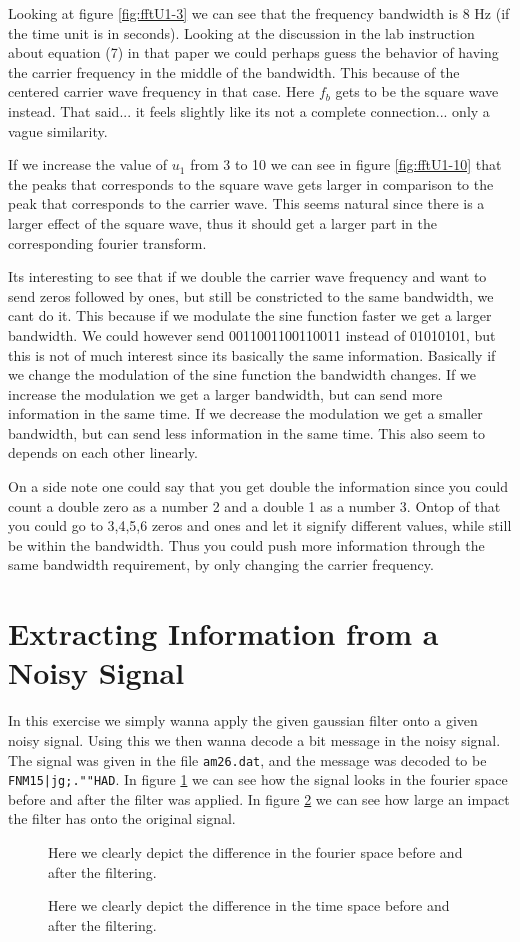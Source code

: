 \documentclass[11pt]{article}
\begin{document}
Looking at figure \ref{fig:fftU1-3} we can see that the frequency bandwidth is 8 Hz (if the time unit is in seconds). Looking at the discussion in the lab instruction about equation (7) in that paper we could perhaps guess the behavior of having  the carrier frequency in the middle of the bandwidth. This because of the centered carrier wave frequency in that case. Here $f_b$ gets to be the square wave instead. That said... it feels slightly like its not a complete connection... only a vague similarity. 

If we increase the value of $u_1$ from 3 to 10 we can see in figure \ref{fig:fftU1-10} that the peaks that corresponds to the square wave gets larger in comparison to the peak that corresponds to the carrier wave. This seems natural since there is a larger effect of the square wave, thus it should get a larger part in the corresponding fourier transform. 

Its interesting to see that if we double the carrier wave frequency and want to send zeros followed by ones, but still be constricted to the same bandwidth, we cant do it. This because if we modulate the sine function faster we get a larger bandwidth. We could however send 0011001100110011 instead of 01010101, but this is not of much interest since its basically the same information. Basically if we change the modulation of the sine function the bandwidth changes. If we increase the modulation we get a larger bandwidth, but can send more information in the same time. If we decrease the modulation we get a smaller bandwidth, but can send less information in the same time. This also seem to depends on each other linearly. 

On a side note one could say that you get double the information since you could count a double zero as a number 2 and a double 1 as a number 3. Ontop of that you could go to 3,4,5,6 zeros and ones and let it signify different values, while still be within the bandwidth. Thus you could push more information through the same bandwidth requirement, by only changing the carrier frequency. 

\newpage
\section{Extracting Information from a Noisy Signal}
In this exercise we simply wanna apply the given gaussian filter onto a given noisy signal. Using this we then wanna decode a bit message in the noisy signal. The signal was given in the file \verb+am26.dat+, and the message was decoded to be \verb+FNM15|jg;.""HAD+. In figure \ref{fig:freqPowSpec} we can see how the signal looks in the fourier space before and after the filter was applied. In figure \ref{fig:signal} we can see how large an impact the filter has onto the original signal. 
\begin{figure}[H]
	\centering
	\newlength\figureheight 
	\newlength\figurewidth 
	\setlength\figureheight{8cm} 
	\setlength\figurewidth{6cm}
	
	\caption{Here we clearly depict the difference in the fourier space before and after the filtering.}
	\label{fig:freqPowSpec}
\end{figure}

\begin{figure}[H]
	\centering
	\setlength\figureheight{8cm} 
	\setlength\figurewidth{6cm}
	
	\caption{Here we clearly depict the difference in the time space before and after the filtering.}
	\label{fig:signal}
\end{figure}
\end{document}
